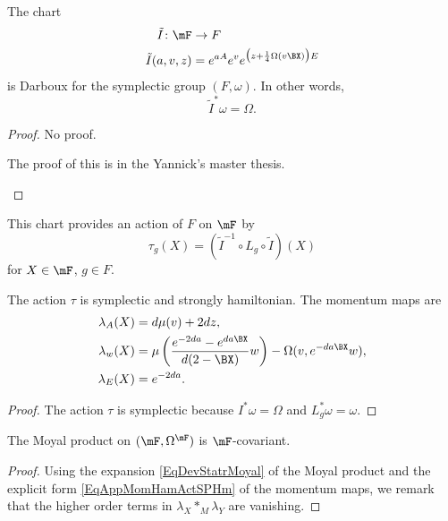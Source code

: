 \begin{proposition}
The chart \begin{equation}
\begin{aligned}
 \tilde I\colon \mF&\to F \\ 
\tilde I(a,v,z)&=  e^{aA} e^{v} e^{\big(z+\frac{1}{ 4 }\Omega(v\BX )\big)E}
\end{aligned}
\end{equation}
is Darboux for the symplectic group $(F,\omega)$. In other words,
\[ 
  \tilde I^*\omega=\Omega.
\]
\end{proposition}
\begin{proof}
No proof.
\begin{probleme}
    The proof of this is in the Yannick's master thesis.
\label{ProbMemYan}
\end{probleme}

\end{proof}

This chart provides an action of $F$ on $\mF$ by
\[ 
  \tau_{g}(X)=(\tilde I^{-1}\circ L_{g}\circ \tilde I)(X)
\]
for $X\in\mF$, $g\in F$.\begin{proposition}
The action $\tau$ is symplectic and strongly hamiltonian. The momentum maps are
\begin{subequations}\label{EqAppMomHamActSPHm}
\begin{align}  
  \lambda_{A}(X)&=d\mu(v)+2dz,\\
\lambda_{w}(X)&=\mu\left( \frac{  e^{-2da}- e^{da\BX } }{ d(2-\BX ) }w \right)-\Omega(v, e^{-da\BX }w),\\
\lambda_{E}(X)&= e^{-2da}.
\end{align}
\end{subequations}
\end{proposition}

\begin{proof}
The action $\tau$ is symplectic because $I^*\omega=\Omega$ and $L_{g}^*\omega=\omega$.
\end{proof}

\begin{proposition}
The Moyal product on $(\mF,\Omega^{\mF})$ is $\mF$-covariant.
\end{proposition}

\begin{proof}
Using the expansion \eqref{EqDevStatrMoyal} of the Moyal product and the explicit form \eqref{EqAppMomHamActSPHm} of the momentum maps, we remark that the higher order terms in $\lambda_{X}\ast_{M}\lambda_{Y}$ are vanishing.
\end{proof}

